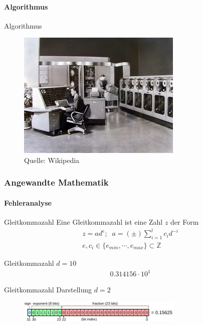 \documentclass{beamer}
\begin{document}
\begin{frame}
\framesubtitle{Algorithmus}
    \begin{block}{Algorithmus}
\begin{figure}[H]
      \centering
    \includegraphics[width=0.7\textwidth]{images/computer}
      \caption{Quelle: Wikipedia}
\end{figure}
\end{block}

 \end{frame}






\begin{frame}
    \frametitle{Angewandte Mathematik}
\framesubtitle{Fehleranalyse}
    \begin{block}{Gleitkommazahl}
Eine Gleitkommazahl ist eine Zahl $z$ der Form
\begin{align*}
z = a d^e ; \;\;
a = (\pm) \sum_{i=1}^l c_i d^{-i} \\
e, c_i \in \{e_{min}, \cdots , e_{max}  \} \subset \mathbb{Z}
\end{align*}
\end{block}

    \begin{block}{Gleitkommazahl $d=10$}
\begin{align*}
0.314156 \cdot 10^1
\end{align*}
\end{block}

\begin{block}{Gleitkommazahl Darstellung $d=2$}
\begin{figure}[H]
    \centering
  \includegraphics[width=0.7\textwidth]{images/float}\end{figure}
\end{block}

 \end{frame}
\end{document}
